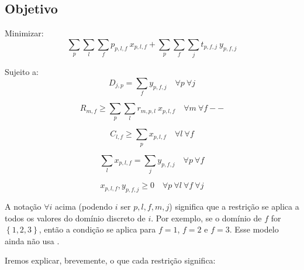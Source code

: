 \documentclass{article}
\newcommand{\Set}[1]{$\left\{#1\right\}$}
\newcommand{\Sum}[1]{\displaystyle\sum\limits_{#1}}
\begin{document}
\subsection{Objetivo}

Minimizar:
\begin{equation}
    \label{objective}
 	\Sum{p}\Sum{l}\Sum{f} p_{p,l,f} \  x_{p,l,f}
	+
	\Sum{p}\Sum{f}\Sum{j} t_{p,f,j} \  y_{p,f,j}
\end{equation}

Sujeito a:
\begin{equation}
	\label{constraint:demand}
	D_{j,p} = \Sum{f} y_{p,f,j}
	\quad \forall p \ \forall j
\end{equation}

\begin{equation}
	\label{constraint:resources}
	R_{m,f} \geq \Sum{p} \Sum{l} r_{m,p,l} \ x_{p,l,f}
	\quad \forall m \ \forall f
--\end{equation}

\begin{equation}
	\label{constraint:production-capacity}
	C_{l,f} \geq \Sum{p} x_{p,l,f}
	\quad \forall l \ \forall f
\end{equation}

\begin{equation}
	\label{constraint:compatibility}
	\Sum{l} x_{p,l,f} = \Sum{j} y_{p,f,j}
	\quad \forall p \ \forall f
\end{equation}

\begin{equation}
	\label{constraint:non-negativity}
	x_{p,l,f}, y_{p,f,j} \geq 0
	\quad \forall p \ \forall l \ \forall f \ \forall j
\end{equation}

A notação $\forall i$ acima (podendo $i$ ser $p, l, f, m, j$) significa que a restrição se aplica a todos os valores do domínio discreto de $i$. Por exemplo, se o domínio de $f$ for \Set{1, 2, 3}, então a condição se aplica para $f=1$, $f=2$ e $f=3$. Esse modelo ainda não usa \cite{bib:gurobi}.

Iremos explicar, brevemente, o que cada restrição significa:
\end{document}

